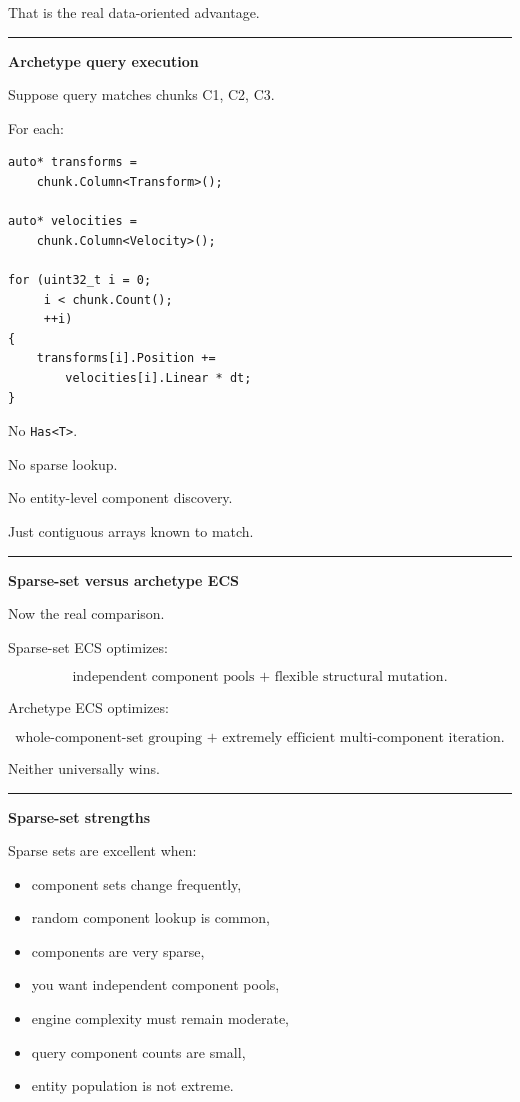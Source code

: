 That is the real data-oriented advantage.

\begin{center}\rule{0.5\linewidth}{0.5pt}\end{center}

\textbf{Archetype query execution}

Suppose query matches chunks C1, C2, C3.

For each:

\begin{verbatim}
auto* transforms =
    chunk.Column<Transform>();

auto* velocities =
    chunk.Column<Velocity>();

for (uint32_t i = 0;
     i < chunk.Count();
     ++i)
{
    transforms[i].Position +=
        velocities[i].Linear * dt;
}
\end{verbatim}

No \texttt{Has\textless{}T\textgreater{}}.

No sparse lookup.

No entity-level component discovery.

Just contiguous arrays known to match.

\begin{center}\rule{0.5\linewidth}{0.5pt}\end{center}

\textbf{Sparse-set versus archetype ECS}

Now the real comparison.

Sparse-set ECS optimizes:

\[
\boxed{
\text{independent component pools + flexible structural mutation}.
}
\]

Archetype ECS optimizes:

\[
\boxed{
\text{whole-component-set grouping + extremely efficient multi-component iteration}.
}
\]

Neither universally wins.

\begin{center}\rule{0.5\linewidth}{0.5pt}\end{center}

\textbf{Sparse-set strengths}

Sparse sets are excellent when:

\begin{itemize}
\tightlist
\item
  component sets change frequently,
\item
  random component lookup is common,
\item
  components are very sparse,
\item
  you want independent component pools,
\item
  engine complexity must remain moderate,
\item
  query component counts are small,
\item
  entity population is not extreme.
\end{itemize}

